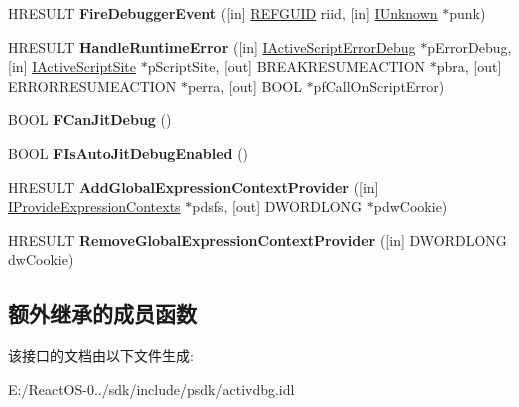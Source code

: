 \begin{DoxyCompactItemize}
\item 
\mbox{\label{interface_i_debug_application64_a54e30fa68e75e67c25109bf4e469819c}} 
H\+R\+E\+S\+U\+LT {\bfseries Fire\+Debugger\+Event} (\mbox{[}in\mbox{]} \hyperlink{struct___g_u_i_d}{R\+E\+F\+G\+U\+ID} riid, \mbox{[}in\mbox{]} \hyperlink{interface_i_unknown}{I\+Unknown} $\ast$punk)
\item 
\mbox{\label{interface_i_debug_application64_a36155f18b99f74b9d79d2d3377e2370b}} 
H\+R\+E\+S\+U\+LT {\bfseries Handle\+Runtime\+Error} (\mbox{[}in\mbox{]} \hyperlink{interface_i_active_script_error_debug}{I\+Active\+Script\+Error\+Debug} $\ast$p\+Error\+Debug, \mbox{[}in\mbox{]} \hyperlink{interface_i_active_script_site}{I\+Active\+Script\+Site} $\ast$p\+Script\+Site, \mbox{[}out\mbox{]} B\+R\+E\+A\+K\+R\+E\+S\+U\+M\+E\+A\+C\+T\+I\+ON $\ast$pbra, \mbox{[}out\mbox{]} E\+R\+R\+O\+R\+R\+E\+S\+U\+M\+E\+A\+C\+T\+I\+ON $\ast$perra, \mbox{[}out\mbox{]} B\+O\+OL $\ast$pf\+Call\+On\+Script\+Error)
\item 
\mbox{\label{interface_i_debug_application64_aa62cd67dd84f5a50ec97edc2cd140c30}} 
B\+O\+OL {\bfseries F\+Can\+Jit\+Debug} ()
\item 
\mbox{\label{interface_i_debug_application64_af9ff9ac18afb84525b2febc83e544dca}} 
B\+O\+OL {\bfseries F\+Is\+Auto\+Jit\+Debug\+Enabled} ()
\item 
\mbox{\label{interface_i_debug_application64_abb1fd985b87bddc80a62f50e0956f345}} 
H\+R\+E\+S\+U\+LT {\bfseries Add\+Global\+Expression\+Context\+Provider} (\mbox{[}in\mbox{]} \hyperlink{interface_i_provide_expression_contexts}{I\+Provide\+Expression\+Contexts} $\ast$pdsfs, \mbox{[}out\mbox{]} D\+W\+O\+R\+D\+L\+O\+NG $\ast$pdw\+Cookie)
\item 
\mbox{\label{interface_i_debug_application64_a4b7a54416964f678237d1fa80ad3031d}} 
H\+R\+E\+S\+U\+LT {\bfseries Remove\+Global\+Expression\+Context\+Provider} (\mbox{[}in\mbox{]} D\+W\+O\+R\+D\+L\+O\+NG dw\+Cookie)
\end{DoxyCompactItemize}
\subsection*{额外继承的成员函数}


该接口的文档由以下文件生成\+:\begin{DoxyCompactItemize}
\item 
E\+:/\+React\+O\+S-\/0../sdk/include/psdk/activdbg.\+idl\end{DoxyCompactItemize}
